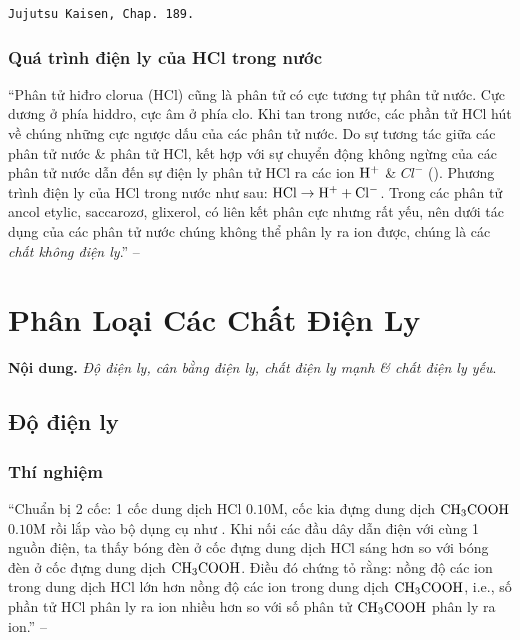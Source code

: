 \documentclass[oneside]{book}
\numberwithin{equation}{section}
\begin{document}
\texttt{Jujutsu Kaisen, Chap. 189.}

\subsubsection{Quá trình điện ly của HCl trong nước}
``Phân tử hiđro clorua (HCl) cũng là phân tử có cực tương tự phân tử nước. Cực dương ở phía hiddro, cực âm ở phía clo. Khi tan trong nước, các phần tử HCl hút về chúng những cực ngược dấu của các phân tử nước. Do sự tương tác giữa các phân tử nước \& phân tử HCl, kết hợp với sự chuyển động không ngừng của các phân tử nước dẫn đến sự điện ly phân tử HCl ra các ion $\rm H^+$ \& $Cl^-$ (\cite[Hình 1.4: \textsf{Sơ đồ quá  trình phân ly ra ion của phân tử HCl trong nước (Thực tế trong dung dịch $\rm H^+$ luôn tồn tại dưới dạng $\rm H_3O^+$)}, p. 6]{SGK_Hoa_Hoc_11_nang_cao}). Phương trình điện ly của HCl trong nước như sau: $\rm HCl\to H^+ + Cl^-$. Trong các phân tử ancol etylic, saccarozơ, glixerol, có liên kết phân cực nhưng rất yếu, nên dưới tác dụng của các phân tử nước chúng không thể phân ly ra ion được, chúng là các \textit{chất không điện ly}.'' -- \cite[pp. 6--7]{SGK_Hoa_Hoc_11_nang_cao}


\section{Phân Loại Các Chất Điện Ly}
\textbf{Nội dung.} \textit{Độ điện ly, cân bằng điện ly, chất điện ly mạnh \& chất điện ly yếu}.

\subsection{Độ điện ly}

\subsubsection{Thí nghiệm}
``Chuẩn bị 2 cốc: 1 cốc dung dịch HCl $0.10$M, cốc kia đựng dung dịch $\rm CH_3COOH$ $0.10$M rồi lắp vào bộ dụng cụ như \cite[ Hình 1.1, p. 4]{SGK_Hoa_Hoc_11_nang_cao}. Khi nối các đầu dây dẫn điện với cùng 1 nguồn điện, ta thấy bóng đèn ở cốc đựng dung dịch HCl sáng hơn so với bóng đèn ở cốc đựng dung dịch $\rm CH_3COOH$. Điều đó chứng tỏ rằng: nồng độ các ion trong dung dịch HCl lớn hơn nồng độ các ion trong dung dịch $\rm CH_3COOH$, i.e., số phần tử HCl phân ly ra ion nhiều hơn so với số phân tử $\rm CH_3COOH$ phân ly ra ion.'' -- \cite[p. 8]{SGK_Hoa_Hoc_11_nang_cao}
\end{document}
